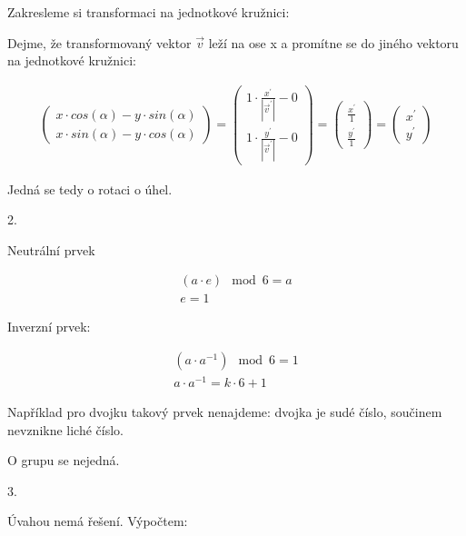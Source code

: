 \documentclass[10pt,a4paper]{article}
\begin{document}
Zakresleme si transformaci na jednotkové kružnici:

Dejme, že transformovaný vektor $\vec{v}$ leží na ose x a promítne se do jiného vektoru na jednotkové kružnici:

\begin{align*}
\begin{pmatrix}
x \cdot cos(\alpha) - y \cdot sin(\alpha)  \\
x \cdot sin(\alpha) - y \cdot cos(\alpha)
\end{pmatrix} = 
\begin{pmatrix}
1 \cdot \frac{x^{\prime}}{|\vec{v}^{\prime}|} - 0 \\
1 \cdot \frac{y^{\prime}}{|\vec{v}^{\prime}|} - 0
\end{pmatrix} = 
\begin{pmatrix}
 \frac{x^{\prime}}{1}\\
 \frac{y^{\prime}}{1}
\end{pmatrix} = 
\begin{pmatrix}
x^{\prime}\\
y^{\prime}
\end{pmatrix} 
\end{align*}

Jedná se tedy o rotaci o úhel.


\hfill

2.

Neutrální prvek

\begin{align*}
(a \cdot e) \mod 6 = a \\
e = 1
\end{align*}
 
Inverzní prvek:

\begin{align*}
(a \cdot a^{-1}) \mod 6 = 1  \\
a \cdot a^{-1} = k \cdot 6 + 1
\end{align*}

Například pro dvojku takový prvek nenajdeme: dvojka je sudé číslo, součinem nevznikne liché číslo.

O grupu se nejedná.

\hfill

3.

Úvahou nemá řešení. Výpočtem:
\end{document}
